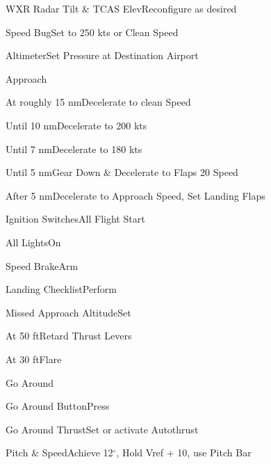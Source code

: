 \documentclass[sim-use, blue_items]{checklist}
\begin{document}
\begin{continuedchecklist}
	\item{WXR Radar Tilt \& TCAS Elev}{Reconfigure as desired}
	 {
		\item{Speed Bug}{Set to 250 kts or Clean Speed}
	}
	 {
		\item{Altimeter}{Set Pressure at Destination Airport}
	}
\end{continuedchecklist}

\begin{checklist}{Approach}
	\item{At roughly 15 nm}{Decelerate to clean Speed}
	\item{Until 10 nm}{Decelerate to 200 kts}
	\item{Until 7 nm}{Decelerate to 180 kts}
	\item{Until 5 nm}{Gear Down \& Decelerate to Flaps 20 Speed}
	\item{After 5 nm}{Decelerate to Approach Speed, Set Landing Flaps}
	\item{Ignition Switches}{All Flight Start}
	\item{All Lights}{On}
	\item{Speed Brake}{Arm}
	\item{Landing Checklist}{Perform}
	 {
		\item{Missed Approach Altitude}{Set}
	}
	\item{At 50 ft}{Retard Thrust Levers}
	\item{At 30 ft}{Flare}
\end{checklist}

\begin{checklist}{Go Around}
	\item{Go Around Button}{Press}
	\item{Go Around Thrust}{Set or activate Autothrust}
	\item{Pitch \& Speed}{Achieve 12$^\circ$, Hold Vref + 10, use Pitch Bar}
\end{checklist}
\end{document}
